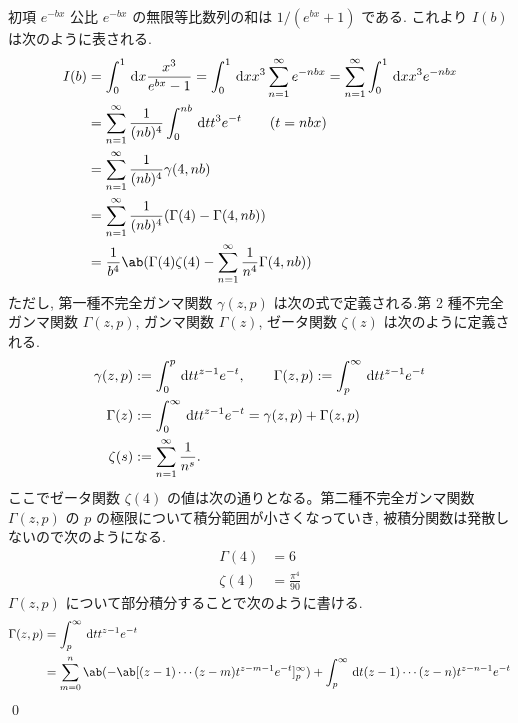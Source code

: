 \documentclass[uplatex,diffipdfmx,a4paper,11pt]{jlreq}
\makeatletter
\numberwithin{equation}{section}
\theoremstyle{definition}
\renewenvironment{proof}[1][\proofname]{\par
  \normalfont
  \topsep6\p@\@plus6\p@ \trivlist
  \item[\hskip\labelsep{\bfseries #1}\@addpunct{\bfseries}]\ignorespaces\quad\par
}{%
  \qed\endtrivlist\@endpefalse
}
\renewcommand\proofname{証明}
\makeatother
\begin{document}
\begin{proof}
  初項 $e^{-bx}$ 公比 $e^{-bx}$ の無限等比数列の和は $1/(e^{bx} + 1)$ である. これより $I(b)$ は次のように表される.
  \begin{align}
    I(b) & = \int_0^1\dl{x}\frac{x^3}{e^{bx} - 1} = \int_0^1\dl{x}x^3\sum_{n=1}^{\infty}e^{-nbx} = \sum_{n=1}^{\infty}\int_0^1\dl{x}x^3e^{-nbx} \\
         & = \sum_{n=1}^{\infty}\frac{1}{(nb)^4}\int_0^{nb}\dl{t}t^3e^{-t} \qquad (t = nbx)                                                     \\
         & = \sum_{n=1}^{\infty}\frac{1}{(nb)^4}\gamma(4, nb)                                                                                   \\
         & = \sum_{n=1}^{\infty}\frac{1}{(nb)^4}(\Gamma(4) - \Gamma(4, nb))                                                                     \\
         & = \frac{1}{b^4}\ab(\Gamma(4)\zeta(4) - \sum_{n=1}^{\infty}\frac{1}{n^4}\Gamma(4, nb))
  \end{align}
  ただし, 第一種不完全ガンマ関数 $\gamma(z, p)$ は次の式で定義される.第 2 種不完全ガンマ関数 $\Gamma(z, p)$, ガンマ関数 $\Gamma(z)$, ゼータ関数 $\zeta(z)$ は次のように定義される.
  \begin{align}
    \gamma(z, p) & := \int_0^p\dl{t}t^{z-1}e^{-t}, \qquad \Gamma(z, p) := \int_p^\infty\dl{t}t^{z-1}e^{-t} \\
    \Gamma(z)    & := \int_0^\infty\dl{t}t^{z-1}e^{-t} = \gamma(z, p) + \Gamma(z, p)                       \\
    \zeta(s)     & := \sum_{n=1}^{\infty}\frac{1}{n^s}.
  \end{align}
  ここでゼータ関数 $\zeta(4)$ の値は次の通りとなる。第二種不完全ガンマ関数 $\Gamma(z,p)$ の $p$ の極限について積分範囲が小さくなっていき, 被積分関数は発散しないので次のようになる.
  \begin{align}
    \Gamma(4) & = 6                \\
    \zeta(4)  & = \frac{\pi^4}{90}
  \end{align}
  $\Gamma(z, p)$ について部分積分することで次のように書ける.
  \begin{align}
    \Gamma(z, p) & = \int_p^\infty\dl{t}t^{z-1}e^{-t}                                                                                      \\
                 & = \sum_{m=0}^n\ab(-\ab[(z-1)\cdots(z-m)t^{z-m-1}e^{-t}]_p^\infty) + \int_p^\infty\dl{t} (z-1)\cdots(z-n)t^{z-n-1}e^{-t} \\

\end{align}
\end{proof}
\end{document}
